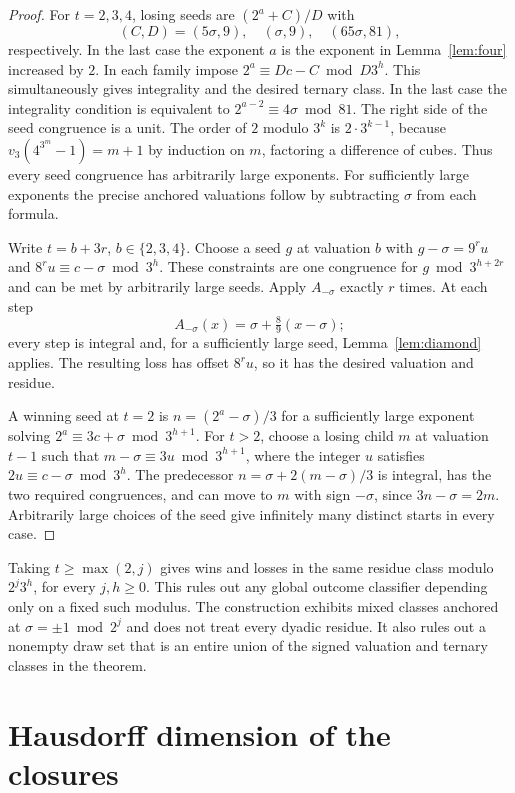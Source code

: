 \documentclass[11pt]{article}
\newcommand{\vThree}{v_3}
\begin{document}
\begin{proof}
For \(t=2,3,4\), losing seeds are \((2^a+C)/D\) with
\[
 (C,D)=(5\sigma,9),\quad(\sigma,9),\quad(65\sigma,81),
\]
respectively. In the last case the exponent \(a\) is the exponent in Lemma~\ref{lem:four} increased by \(2\). In each family impose \(2^a\equiv Dc-C\bmod D3^h\). This simultaneously gives integrality and the desired ternary class. In the last case the integrality condition is equivalent to \(2^{a-2}\equiv4\sigma\bmod81\). The right side of the seed congruence is a unit. The order of \(2\) modulo \(3^k\) is \(2\cdot3^{k-1}\), because \(\vThree(4^{3^m}-1)=m+1\) by induction on \(m\), factoring a difference of cubes. Thus every seed congruence has arbitrarily large exponents. For sufficiently large exponents the precise anchored valuations follow by subtracting \(\sigma\) from each formula.

Write \(t=b+3r\), \(b\in\{2,3,4\}\). Choose a seed \(g\) at valuation \(b\) with \(g-\sigma=9^r u\) and \(8^r u\equiv c-\sigma\bmod3^h\). These constraints are one congruence for \(g\bmod3^{h+2r}\) and can be met by arbitrarily large seeds. Apply \(A_{-\sigma}\) exactly \(r\) times. At each step
\[
 A_{-\sigma}(x)=\sigma+\tfrac89(x-\sigma);
\]
every step is integral and, for a sufficiently large seed, Lemma~\ref{lem:diamond} applies. The resulting loss has offset \(8^r u\), so it has the desired valuation and residue.

A winning seed at \(t=2\) is \(n=(2^a-\sigma)/3\) for a sufficiently large exponent solving \(2^a\equiv3c+\sigma\bmod3^{h+1}\). For \(t>2\), choose a losing child \(m\) at valuation \(t-1\) such that \(m-\sigma\equiv3u\bmod3^{h+1}\), where the integer \(u\) satisfies \(2u\equiv c-\sigma\bmod3^h\). The predecessor \(n=\sigma+2(m-\sigma)/3\) is integral, has the two required congruences, and can move to \(m\) with sign \(-\sigma\), since \(3n-\sigma=2m\). Arbitrarily large choices of the seed give infinitely many distinct starts in every case.
\end{proof}

Taking \(t\ge\max(2,j)\) gives wins and losses in the same residue class modulo \(2^j3^h\), for every \(j,h\ge0\). This rules out any global outcome classifier depending only on a fixed such modulus. The construction exhibits mixed classes anchored at \(\sigma=\pm1\bmod2^j\) and does not treat every dyadic residue. It also rules out a nonempty draw set that is an entire union of the signed valuation and ternary classes in the theorem.

\section{Hausdorff dimension of the closures}
\end{document}
